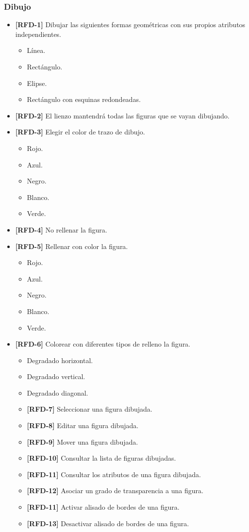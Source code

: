 \subsubsection{Dibujo}
\begin{itemize}
\item{\textbf{[RFD-1]} Dibujar las siguientes formas geométricas con sus propios atributos independientes.
\begin{itemize}
\item{Línea.}
\item{Rectángulo.}
\item{Elipse.}
\item{Rectángulo con esquinas redondeadas.}
\end{itemize}
}
\item{\textbf{[RFD-2]} El lienzo mantendrá todas las figuras que se vayan dibujando.}
\item{\textbf{[RFD-3]} Elegir el color de trazo de dibujo.
\begin{itemize}
\item{Rojo.}
\item{Azul.}
\item{Negro.}
\item{Blanco.}
\item{Verde.}
\end{itemize}
}
\item{\textbf{[RFD-4]} No rellenar la figura.}
\item{\textbf{[RFD-5]} Rellenar con color la figura.
\begin{itemize}
\item{Rojo.}
\item{Azul.}
\item{Negro.}
\item{Blanco.}
\item{Verde.}
\end{itemize}
}
\item{\textbf{[RFD-6]} Colorear con diferentes tipos de relleno la figura.}
\begin{itemize}
\item{Degradado horizontal.}
\item{Degradado vertical.}
\item{Degradado diagonal.}
\item{\textbf{[RFD-7]} Seleccionar una figura dibujada.}
\item{\textbf{[RFD-8]} Editar una figura dibujada.}
\item{\textbf{[RFD-9]} Mover una figura dibujada.}
\item{\textbf{[RFD-10]} Consultar la lista de figuras dibujadas.}
\item{\textbf{[RFD-11]} Consultar los atributos de una figura dibujada.}
\item{\textbf{[RFD-12]} Asociar un grado de transparencia a una figura.}
\item{\textbf{[RFD-11]} Activar alisado de bordes de una figura.}
\item{\textbf{[RFD-13]} Desactivar alisado de bordes de una figura.}
\end{itemize}
\end{itemize}
